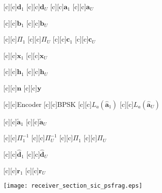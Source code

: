 \documentclass{article}
\begin{document}
\begin{figure}[htb]
  \begin{center}


        [c][c]{$\mathrm{\mathbf{d}}_1$}
        [c][c]{$\mathrm{\mathbf{d}}_U$}
        [c][c]{$\mathrm{\mathbf{a}}_1$}
        [c][c]{$\mathrm{\mathbf{a}}_U$}

        [c][c]{$\mathrm{\mathbf{b}}_1$}
        [c][c]{$\mathrm{\mathbf{b}}_U$}
	
        [c][c]{$\Pi_1$}
        [c][c]{$\Pi_U$}
        [c][c]{$\mathrm{\mathbf{c}}_1$}
        [c][c]{$\mathrm{\mathbf{c}}_U$}

        [c][c]{$\mathrm{\mathbf{x}}_1$}
        [c][c]{$\mathrm{\mathbf{x}}_U$}
	
	[c]{$\mathrm{\mathbf{h}}_1$}
        [c][c]{$\mathrm{\mathbf{h}}_U$}


        [c][c]{$\mathrm{\mathbf{n}}$}
        [c][c]{$\mathrm{\mathbf{y}}$}

        [c][c]{Encoder}
        [c][c]{BPSK}
	[c]{$L_a(\mathrm{\mathbf{\hat{a}}}_1)$}
        [c][c]{$L_a(\mathrm{\mathbf{\hat{a}}}_U)$}

	
	
	
        
        
	[c]{\hspace{3mm}$\mathrm{\mathbf{\tilde{a}}}_1$}
        [c][c]{\hspace{3mm}$\mathrm{\mathbf{\tilde{a}}}_U$}
        
	[c]{\hspace{1mm}$\Pi_1^{-1}$}
        [c][c]{\hspace{1mm}$\Pi_U^{-1}$}
        [c][c]{$\Pi_1$}
        [c][c]{$\Pi_U$}
       
	[c]{$\mathrm{\mathbf{\hat{d}}}_1$}
        [c][c]{$\mathrm{\mathbf{\hat{d}}}_U$}
	

        [c][c]{$\mathrm{\mathbf{r}}_1$}
	[c]{$\mathrm{\mathbf{r}}_U$}
	

	
	
	


    \texttt{[image: receiver\_section\_sic\_psfrag.eps]}
    \end{center}
\end{figure}
\end{document}
